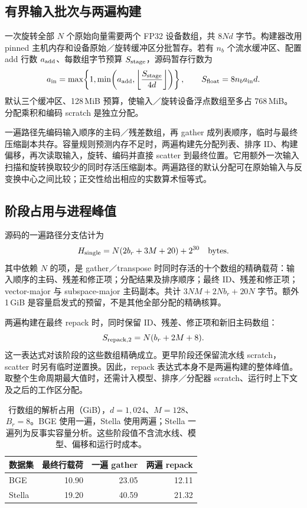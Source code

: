 \subsection{有界输入批次与两遍构建}

一次旋转全部 $N$ 个原始向量需要两个 FP32 设备数组，共 $8Nd$ 字节。构建器改用 pinned 主机内存和设备原始／旋转缓冲区分批暂存。若有 $n_b$ 个流水缓冲区、配置 add 行数 $a_{\rm add}$、每数组字节预算
$S_{\rm stage}$，源码暂存行数为
\begin{equation}
 a_{\rm in}=\max\!\left\{1,\min\!\left(a_{\rm add},
 \left\lfloor\frac{S_{\rm stage}}{4d}\right\rfloor\right)\right\},
 \qquad S_{\rm float}=8n_ba_{\rm in}d.
 \label{eq:4-staging-rows}
\end{equation}
默认三个缓冲区、128\,MiB 预算，使输入／旋转设备浮点数组至多占 768\,MiB。
分配乘积和编码 scratch 是独立分配。

一遍路径先编码输入顺序的主码／残差数组，再 gather 成列表顺序，临时与最终压缩副本共存。容量规则预测内存不足时，两遍构建先分配列表、排序 ID、构建偏移，再次读取输入，旋转、编码并直接 scatter 到最终位置。它用额外一次输入扫描和旋转换取较少的同时存活压缩副本。两遍路径的默认分配可在原始输入与反变换中心之间比较；正交性给出相应的实数算术恒等式。

\subsection{阶段占用与进程峰值}

源码的一遍路径分支估计为
\begin{equation}
 H_{\rm single}=N(2b_r+3M+20)+2^{30}\quad\text{bytes}.
 \label{eq:4-peak-heuristic}
\end{equation}
其中依赖 $N$ 的项，是 gather／transpose 时同时存活的十个数组的精确载荷：输入顺序的主码、残差和修正项；分配结果及排序顺序；最终 ID、残差和修正项；vector-major 与 subspace-major 主码副本。共计 $3NM+2Nb_r+20N$ 字节。额外 1\,GiB 是容量启发式的预留，不是其他全部分配的精确核算。

两遍构建在最终 repack 时，同时保留 ID、残差、修正项和新旧主码数组：
\begin{equation}
 S_{\rm repack,2}=N(b_r+2M+8).
 \label{eq:4-two-pass-repack}
\end{equation}
这一表达式对该阶段的这些数组精确成立。更早阶段还保留流水线 scratch，scatter 时另有临时逆置换。因此，repack 表达式本身不是两遍构建的整体峰值。取整个生命周期最大值时，还需计入模型、排序／分配器 scratch、运行时上下文及之后的工作区分配。

\begin{table}[tbp]
\centering
\caption[各构建阶段的行数组显存模型]{行数组的解析占用（GiB），$d=1{,}024$、$M=128$、$B_r=8$。BGE 使用一遍，Stella 使用两遍；Stella 一遍列为反事实容量分析。这些阶段值不含流水线、模型、偏移和运行时成本。}
\label{tab:4-phase-storage}
\small
\begin{tabular}{@{}lrrr@{}}
\toprule
数据集 & 最终行载荷 & 一遍 gather & 两遍 repack \\
\midrule
BGE & 10.90 & 23.05 & 12.11 \\
Stella & 19.20 & 40.59 & 21.32 \\
\bottomrule
\end{tabular}
\end{table}

